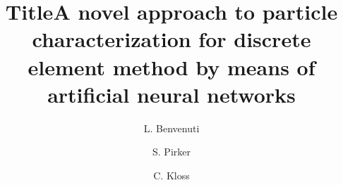 \documentclass[final,3p,times,twocolumn]{elsarticle}
\begin{document}
\begin{frontmatter}


\title{Title}

\title{A novel approach to particle characterization for discrete element method by means of artificial neural networks}


\author[JKU PFM]{L. Benvenuti }

\author[JKU PFM]{S. Pirker}

\address[JKU PFM]{JKU Department of Particulate Flow Modelling - Linz}




\author[DCS]{C. Kloss}
\address[DCS]{DCS Computing - Linz}



\end{frontmatter}
\end{document}
